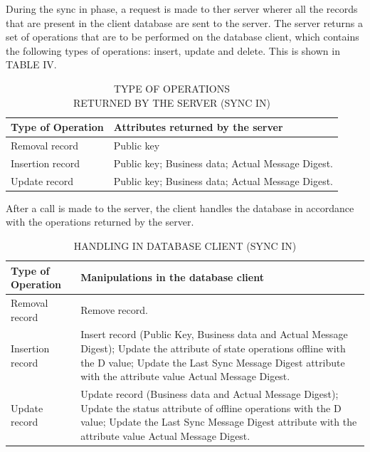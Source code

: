\documentclass[conference]{IEEEtran}
\begin{document}
\begin{enumerate}[label=(\Alph*)]
 During the sync in phase, a request is made to ther server wherer all the records that are present in the client database are sent to the server. The server returns a set of operations that are to be performed on the database client, which contains the following types of operations: insert, update and delete. This is shown in TABLE IV.

\begin{table}[h!]
\centering
\caption{TYPE OF OPERATIONS\\ RETURNED BY THE SERVER (SYNC IN)}
\begin{tabular}{ | m{5em} | m{10em}| } 
\hline
\textbf{Type of Operation} & \textbf{Attributes returned by the server} \\
\hline
Removal record& Public key \\ 
\hline
Insertion record & Public key; Business data; Actual Message Digest.   \\ 
\hline
Update record & Public key; Business data; Actual Message Digest.   \\ 
\hline 
\end{tabular}
\label{table:4}
\end{table}

After a call is made to the server, the client handles the database in accordance with the operations returned by the server.

\begin{table}[h!]
\centering
\caption{HANDLING IN DATABASE CLIENT (SYNC IN)}
\begin{tabular}{ | m{5em} | m{15em}| } 
\hline
\textbf{Type of Operation} & \textbf{Manipulations in the database client} \\
\hline
Removal record& Remove record. \\ 
\hline
Insertion record & Insert record (Public Key, Business data and Actual
Message Digest);
Update the attribute of state operations offline with the
D value;
Update the Last Sync Message Digest attribute with
the attribute value Actual Message Digest.  \\ 
\hline
Update record & Update record (Business data and Actual Message
Digest);
Update the status attribute of offline operations with
the D value;
Update the Last Sync Message Digest attribute with
the attribute value Actual Message Digest.  \\ 
\hline 
\end{tabular}
\label{table:5}
\end{table}


\end{enumerate}
\end{document}
